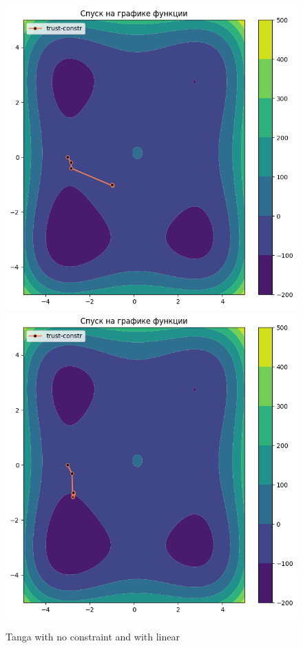 \documentclass[12pt, a4paper, oneside, final]{article}
\begin{document}
	\begin{figure}[H]
		\centering
		\includegraphics[scale = 0.465]{Image/AT_TANGA_NO_CONSTRAINT.png}
		\includegraphics[scale = 0.465]{Image/AT_TANGA_LINEAR_CONSTRAINT.png}
		\caption*{Tanga with no constraint and with linear}
	\end{figure}
\end{document}

